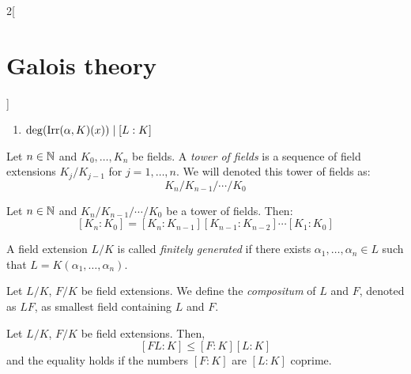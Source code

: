 \documentclass[../../../main.tex]{subfiles}
\begin{document}
\begin{multicols}{2}[\section{Galois theory}]
\begin{proposition}
\begin{enumerate}
      \item $\deg(\operatorname{Irr}(\alpha,K)(x))\mid [L:K]$
    \end{enumerate}
  \end{proposition}
  \begin{definition}
    Let $n\in\mathbb{N}$ and $K_0,\ldots,K_n$ be fields. A \emph{tower of fields} is a sequence of field extensions $K_j/K_{j-1}$ for $j=1,\ldots,n$. We will denoted this tower of fields as: $$K_n/K_{n-1}/\cdots/K_0$$
  \end{definition}
  \begin{corollary}
    Let $n\in\mathbb{N}$ and $K_n/K_{n-1}/\cdots/K_0$ be a tower of fields. Then: $$[K_n:K_0]=[K_n:K_{n-1}][K_{n-1}:K_{n-2}]\cdots[K_1:K_0]$$
  \end{corollary}
  \begin{definition}
    A field extension $L/K$ is called \emph{finitely generated} if there exists $\alpha_1,\ldots,\alpha_n\in L$ such that $L=K(\alpha_1,\ldots,\alpha_n)$.
  \end{definition}
  \begin{definition}
    Let $L/K$, $F/K$ be field extensions. We define the \emph{compositum} of $L$ and $F$, denoted as $LF$, as smallest field containing $L$ and $F$.
  \end{definition}
  \begin{proposition}
    Let $L/K$, $F/K$ be field extensions. Then, $$[FL:K]\leq[F:K][L:K]$$ and the equality holds if the numbers $[F:K]$ are $[L:K]$ coprime.
  \end{proposition}

\end{multicols}
\end{document}
